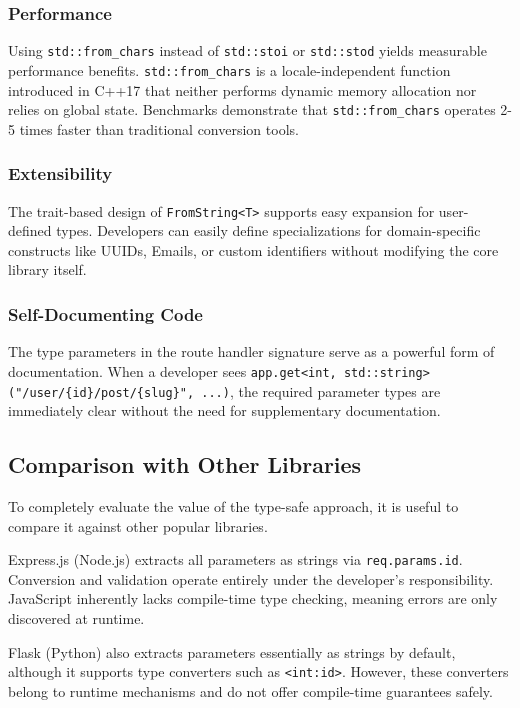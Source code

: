 \subsubsection{Performance}

Using \texttt{std::from\_chars} instead of \texttt{std::stoi} or \texttt{std::stod} yields measurable performance benefits. \texttt{std::from\_chars} is a locale-independent function introduced in C++17 that neither performs dynamic memory allocation nor relies on global state. Benchmarks demonstrate that \texttt{std::from\_chars} operates 2-5 times faster than traditional conversion tools.

\subsubsection{Extensibility}

The trait-based design of \texttt{FromString<T>} supports easy expansion for user-defined types. Developers can easily define specializations for domain-specific constructs like UUIDs, Emails, or custom identifiers without modifying the core library itself.

\subsubsection{Self-Documenting Code}

The type parameters in the route handler signature serve as a powerful form of documentation. When a developer sees \texttt{app.get<int, std::string>("/user/\{id\}/post/\{slug\}", ...)}, the required parameter types are immediately clear without the need for supplementary documentation.

\subsection{Comparison with Other Libraries}

To completely evaluate the value of the type-safe approach, it is useful to compare it against other popular libraries.

Express.js (Node.js) extracts all parameters as strings via \texttt{req.params.id}. Conversion and validation operate entirely under the developer's responsibility. JavaScript inherently lacks compile-time type checking, meaning errors are only discovered at runtime.

Flask (Python) also extracts parameters essentially as strings by default, although it supports type converters such as \texttt{<int:id>}. However, these converters belong to runtime mechanisms and do not offer compile-time guarantees safely.

